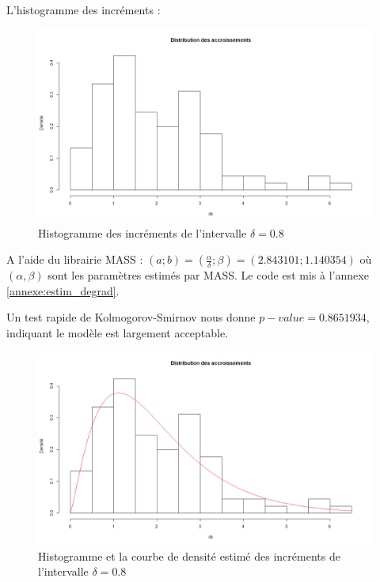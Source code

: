 \documentclass[10pt,a4paper]{article}
\begin{document}
L'histogramme des incréments :
\begin{figure}[!h]
    \centering
    \includegraphics[width=\textwidth]{img/histo_degrad.png}
    \caption{Histogramme des incréments de l'intervalle $\delta = 0.8$}
    \label{fig:histo_degrad}
\end{figure}

A l'aide du librairie MASS : $\left( {a;b} \right) = \left( {\frac{\alpha }{\delta };\beta } \right) = \left( {2.843101;1.140354} \right)$ où $(\alpha, \beta)$ sont les paramètres estimés par MASS. Le code est mis à l'annexe \eqref{annexe:estim_degrad}.

Un test rapide de Kolmogorov-Smirnov nous donne $p-value = 0.8651934$, indiquant le modèle est largement acceptable.
\begin{figure}[!h]
    \centering
    \includegraphics[width=\textwidth]{img/histo_dens_degrad.png}
    \caption{Histogramme et la courbe de densité estimé des incréments de l'intervalle $\delta = 0.8$}
    \label{fig:histo_dens_degrad}
\end{figure}
\end{document}

